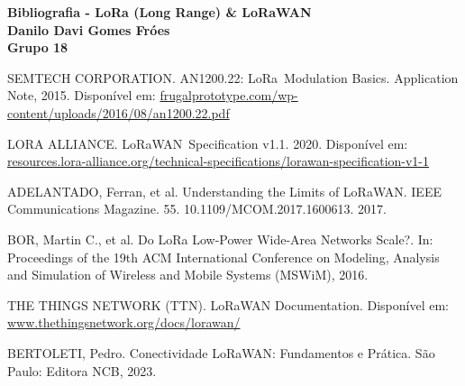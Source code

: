 \documentclass[12pt,a4paper]{article}
\begin{document}
\begin{center}
    {\Large \textbf{Bibliografia - LoRa (Long Range) \& LoRaWAN}} \\[0.6cm]
    {\large \textbf{Danilo Davi Gomes Fróes}} \\[0.4cm]
    {\large \textbf{Grupo 18}}
\end{center}

\vspace{1cm}

\noindent
SEMTECH CORPORATION. AN1200.22: LoRa\texttrademark\ Modulation Basics. Application Note, 2015. Disponível em: \href{http://frugalprototype.com/wp-content/uploads/2016/08/an1200.22.pdf}{frugalprototype.com/wp-content/uploads/2016/08/an1200.22.pdf}

\vspace{0.6cm}
\noindent
LORA ALLIANCE. LoRaWAN\textregistered\ Specification v1.1. 2020. Disponível em: \\ \href{https://resources.lora-alliance.org/technical-specifications/lorawan-specification-v1-1}{resources.lora-alliance.org/technical-specifications/lorawan-specification-v1-1}

\vspace{0.6cm}
\noindent
ADELANTADO, Ferran, et al. Understanding the Limits of LoRaWAN. IEEE Communications Magazine. 55. 10.1109/MCOM.2017.1600613. 2017.

\vspace{0.6cm}
\noindent
BOR, Martin C., et al. Do LoRa Low-Power Wide-Area Networks Scale?. In: Proceedings of the 19th ACM International Conference on Modeling, Analysis and Simulation of Wireless and Mobile Systems (MSWiM), 2016.

\vspace{0.6cm}
\noindent
THE THINGS NETWORK (TTN). LoRaWAN Documentation. Disponível em: \\ \href{https://www.thethingsnetwork.org/docs/lorawan/}{www.thethingsnetwork.org/docs/lorawan/}

\vspace{0.6cm}
\noindent
BERTOLETI, Pedro. Conectividade LoRaWAN: Fundamentos e Prática. São Paulo: Editora NCB, 2023.
\end{document}
